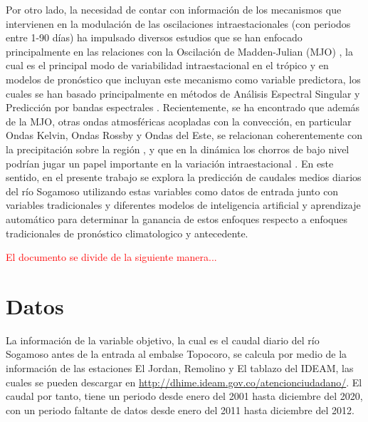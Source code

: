 \documentclass[draft]{agujournal2019}
\begin{document}
Por otro lado, la necesidad de contar con información de los mecanismos que intervienen en la modulación de las oscilaciones intraestacionales (con periodos entre 1-90 días) ha impulsado diversos estudios que se han enfocado principalmente en las relaciones con la Oscilación de Madden-Julian (MJO) \cite{Arias_2005,Poveda_and_Mesa_2000,Torres_Pineda_and_Pabon_Caicedo_2017,Grimm_2019}, la cual es el principal modo de variabilidad intraestacional en el trópico \cite{Madden_Julian_1971,Madden_Julian_1972} y en modelos de pronóstico que incluyan este mecanismo como variable predictora, los cuales se han basado principalmente en métodos de Análisis Espectral Singular y Predicción por bandas espectrales \cite{Arias_2005,Arenas_and_Carvajal_2010,Yepes_2012}. Recientemente, se ha encontrado que además de la MJO, otras ondas atmosféricas acopladas con la convección, en particular Ondas Kelvin, Ondas Rossby y Ondas del Este, se relacionan coherentemente con la precipitación sobre la región \cite{Giraldo-Cardenas_et_al_2021,Hoyos_et_al_no_published,Taborda-Soto_no_published}, y que en la dinámica los chorros de bajo nivel podrían jugar un papel importante en la variación intraestacional \cite{Arias_et_al_2021,Taborda-Soto_no_published,Serra_et_al_2010,Arias_2005}. En este sentido, en el presente trabajo se explora la predicción de caudales medios diarios del río Sogamoso utilizando estas variables como datos de entrada junto con variables tradicionales y diferentes modelos de inteligencia artificial y aprendizaje automático para determinar la ganancia de estos enfoques respecto a enfoques tradicionales de pronóstico climatologico y antecedente.

\textcolor{red}{El documento se divide de la siguiente manera... }




\section{Datos}

La información de la variable objetivo, la cual es el caudal diario del río Sogamoso antes de la entrada al embalse Topocoro, se calcula por medio de la información de las estaciones El Jordan, Remolino y El tablazo del IDEAM, las cuales se pueden descargar en \url{http://dhime.ideam.gov.co/atencionciudadano/}. El caudal por tanto, tiene un periodo desde enero del 2001 hasta diciembre del 2020, con un periodo faltante de datos desde enero del 2011 hasta diciembre del 2012.
\end{document}
